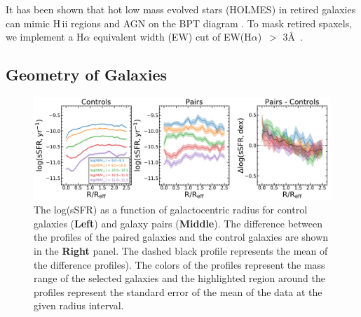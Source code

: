 \documentclass[iop,revtex4,twocolumn,apj,numberedappendix,appendixfloats]{emulateapj}
\newcommand{\OIII}{[O\,{\sc iii}]}
\newcommand{\NII}{[N\,{\sc ii}]}
\newcommand{\ewha}{EW(H$\alpha$)}
\begin{document}



It has been shown that hot low mass evolved stars (HOLMES) in retired galaxies can mimic H\,{\sc ii} regions and AGN on the BPT diagram \citep{Stasinska:2008}. To mask retired spaxels, we implement a H$\alpha$ equivalent width (EW) cut of \ewha\ $>$ 3\AA\ \citep{Cid-Fernandes:2011}. 

\subsection{Geometry of Galaxies}\label{sec:radial}

\begin{figure}
\centering
\includegraphics[width=\linewidth]{fig/ssfr_comb.pdf}
\caption[]{The log(sSFR) as a function of galactocentric radius for control galaxies (\textbf{Left}) and galaxy pairs (\textbf{Middle}). The difference between the profiles of the paired galaxies and the control galaxies are shown in the \textbf{Right} panel. The dashed black profile represents the mean of the difference profiles). The colors of the profiles represent the mass range of the selected galaxies and the highlighted region around the profiles represent the standard error of the mean of the data at the given radius interval.}
\label{fig:ssfr_prof}
\end{figure}
\end{document}
